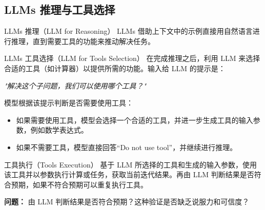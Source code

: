 \subsection{LLMs 推理与工具选择}

\begin{frame}{LLMs 推理（LLM for Reasoning）}
    LLMs 借助上下文中的示例直接用自然语言进行推理，直到需要工具的功能来推动解决任务。
\end{frame}

\begin{frame}{LLMs 工具选择（LLM for Tools Selection）}
    在完成推理之后，利用 LLM 来选择合适的工具（如计算器）以提供所需的功能。输入给 LLM 的提示是：
    
    \textit{"解决这个子问题，我们可以使用哪个工具？"}
    
    模型根据该提示判断是否需要使用工具：
    \begin{itemize}
        \item 如果需要使用工具，模型会选择一个合适的工具，并进一步生成工具的输入参数，例如数学表达式。
        \item 如果不需要工具，模型直接回答“Do not use tool”，并继续进行推理。
    \end{itemize}
\end{frame}

\begin{frame}{工具执行（Tools Execution）}
    基于 LLM 所选择的工具和生成的输入参数，使用该工具并以参数执行计算或任务，获取当前迭代结果。再由 LLM 判断结果是否符合预期，如果不符合预期可以重复执行工具。
    
    
    \textbf{问题：} 由 LLM 判断结果是否符合预期？这种验证是否缺乏说服力和可信度？
\end{frame}